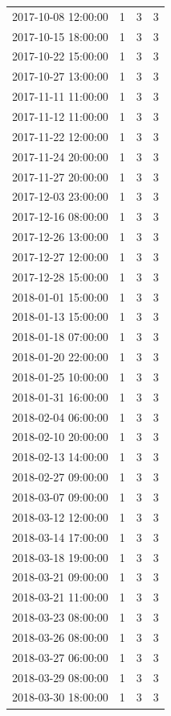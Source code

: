 \begin{tabular}{lrrr}
2017-10-08 12:00:00 & 1 & 3 & 3 \\
2017-10-15 18:00:00 & 1 & 3 & 3 \\
2017-10-22 15:00:00 & 1 & 3 & 3 \\
2017-10-27 13:00:00 & 1 & 3 & 3 \\
2017-11-11 11:00:00 & 1 & 3 & 3 \\
2017-11-12 11:00:00 & 1 & 3 & 3 \\
2017-11-22 12:00:00 & 1 & 3 & 3 \\
2017-11-24 20:00:00 & 1 & 3 & 3 \\
2017-11-27 20:00:00 & 1 & 3 & 3 \\
2017-12-03 23:00:00 & 1 & 3 & 3 \\
2017-12-16 08:00:00 & 1 & 3 & 3 \\
2017-12-26 13:00:00 & 1 & 3 & 3 \\
2017-12-27 12:00:00 & 1 & 3 & 3 \\
2017-12-28 15:00:00 & 1 & 3 & 3 \\
2018-01-01 15:00:00 & 1 & 3 & 3 \\
2018-01-13 15:00:00 & 1 & 3 & 3 \\
2018-01-18 07:00:00 & 1 & 3 & 3 \\
2018-01-20 22:00:00 & 1 & 3 & 3 \\
2018-01-25 10:00:00 & 1 & 3 & 3 \\
2018-01-31 16:00:00 & 1 & 3 & 3 \\
2018-02-04 06:00:00 & 1 & 3 & 3 \\
2018-02-10 20:00:00 & 1 & 3 & 3 \\
2018-02-13 14:00:00 & 1 & 3 & 3 \\
2018-02-27 09:00:00 & 1 & 3 & 3 \\
2018-03-07 09:00:00 & 1 & 3 & 3 \\
2018-03-12 12:00:00 & 1 & 3 & 3 \\
2018-03-14 17:00:00 & 1 & 3 & 3 \\
2018-03-18 19:00:00 & 1 & 3 & 3 \\
2018-03-21 09:00:00 & 1 & 3 & 3 \\
2018-03-21 11:00:00 & 1 & 3 & 3 \\
2018-03-23 08:00:00 & 1 & 3 & 3 \\
2018-03-26 08:00:00 & 1 & 3 & 3 \\
2018-03-27 06:00:00 & 1 & 3 & 3 \\
2018-03-29 08:00:00 & 1 & 3 & 3 \\
2018-03-30 18:00:00 & 1 & 3 & 3 \\

\end{tabular}
